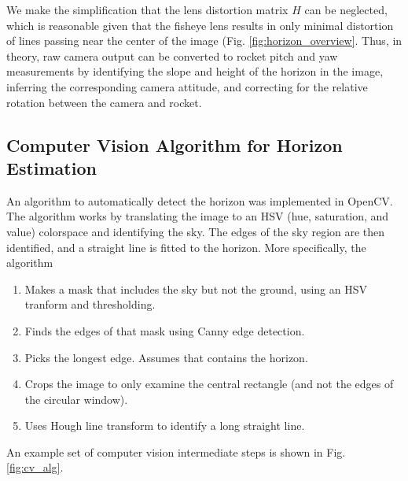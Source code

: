 \documentclass{article}
\begin{document}
We make the simplification that the lens distortion matrix $H$ can be neglected, which is reasonable given that the fisheye lens results in only minimal distortion of lines passing near the center of the image (Fig. \ref{fig:horizon_overview}. Thus, in theory, raw camera output can be converted to rocket pitch and yaw measurements by identifying the slope and height of the horizon in the image, inferring the corresponding camera attitude, and correcting for the relative rotation between the camera and rocket.

\subsection{Computer Vision Algorithm for Horizon Estimation}
An algorithm to automatically detect the horizon was implemented in OpenCV. The algorithm works by translating the image to an HSV (hue, saturation, and value) colorspace and identifying the sky. The edges of the sky region are then identified, and a straight line is fitted to the horizon. More specifically, the algorithm
\begin{enumerate}
    \item Makes a mask that includes the sky but not the ground, using an HSV tranform and thresholding.
    \item Finds the edges of that mask using Canny edge detection.
    \item Picks the longest edge. Assumes that contains the horizon.
    \item Crops the image to only examine the central rectangle (and not the edges of the circular window).
    \item Uses Hough line transform to identify a long straight line.
\end{enumerate}

An example set of computer vision intermediate steps is shown in Fig. \ref{fig:cv_alg}.
\end{document}
